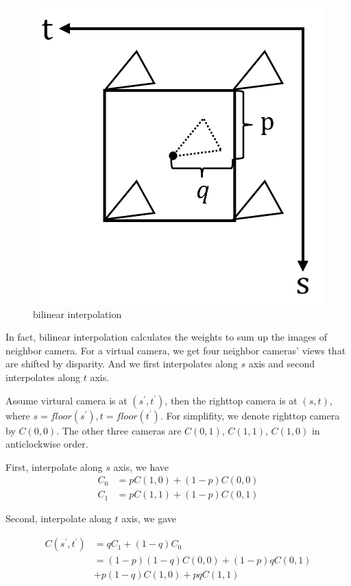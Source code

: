 \documentclass[acmtog]{acmart}
\begin{document}
	\begin{figure}[h]
		\centering
		\includegraphics[scale=0.16]{bilinear interpolation.png}
		\caption{bilinear interpolation}
		\label{fig:Fig3}
	\end{figure}
	
	\quad In fact, bilinear interpolation calculates the weights to sum up the images of neighbor camera. For a virtual camera, we get four neighbor cameras' views that are shifted by disparity. And we first interpolates along $s$ axis and second interpolates along $t$ axis.
	
	\quad Assume virtural camera is at $(s^\prime, t^\prime)$, then the righttop camera is at $(s,t)$, where $s=floor(s^\prime), t=floor(t^\prime)$. For simplifity, we denote righttop camera by $C(0,0)$. The other three cameras are $C(0, 1)$, $C(1, 1)$, $C(1, 0)$ in anticlockwise order.
	
	\quad First, interpolate along $s$ axis, we have 
	\[
	\begin{aligned}
		C_0 &= pC(1, 0) + (1-p)C(0, 0) \\
		C_1 &= pC(1, 1) + (1-p)C(0, 1)
	\end{aligned}
	\]
	
	\quad Second, interpolate along $t$ axis, we gave
	
	\[
	\begin{aligned}
		C(s^\prime, t^\prime) &= qC_1 + (1-q)C_0 \\
		&= (1-p)(1-q)C(0,0) + (1-p)qC(0,1)   \\
		&+ p(1-q)C(1,0) + pqC(1,1)
	\end{aligned}
	\]
	
\end{document}
